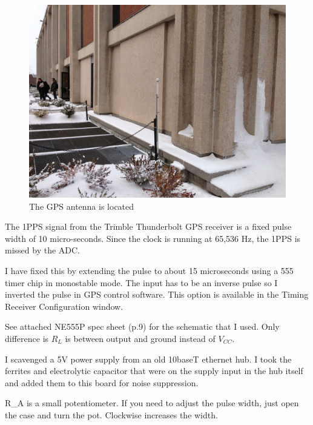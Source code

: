 \begin{figure}[htbp]
	\centering
		\includegraphics[width=15cm]{./figures/IMG_1308.jpg}
	\caption[GPS Antenna Location]{The GPS antenna is located }
	\label{fig:gps_antenna}
\end{figure}

The 1PPS signal from the Trimble Thunderbolt GPS receiver is a fixed pulse width of 10 micro-seconds. Since the clock is running at 65,536 Hz, the 1PPS is missed by the ADC.

I have fixed this by extending the pulse to about 15 microseconds using a 555 timer chip in monostable mode. The input has to be an inverse pulse so I inverted the pulse in GPS control software. This option is available in the Timing Receiver Configuration window.

See attached NE555P spec sheet (p.9) for the schematic that I used. Only difference is $R_L$ is between output and ground instead of $V_{CC}$.

I scavenged a 5V power supply from an old 10baseT ethernet hub. I took the ferrites and electrolytic capacitor that were on the supply input in the hub itself and added them to this board for noise suppression.

R\_A is a small potentiometer. If you need to adjust the pulse width, just open the case and turn the pot. Clockwise increases the width.

